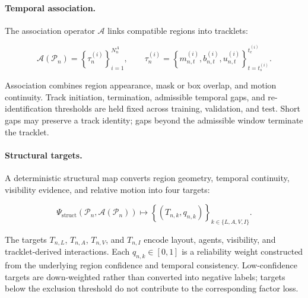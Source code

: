 \paragraph{Temporal association.}
The association operator \(\mathcal A\) links compatible regions into
tracklets:

\begin{equation*}
\mathcal A(\mathcal P_n)
=
\left\{
\tau_n^{(i)}
\right\}_{i=1}^{N_n^A},
\qquad
\tau_n^{(i)}
=
\left\{
m_{n,t}^{(i)},
b_{n,t}^{(i)},
u_{n,t}^{(i)}
\right\}_{t=t_s^{(i)}}^{t_e^{(i)}} .
\end{equation*}

Association combines region appearance, mask or box overlap, and
motion continuity. Track initiation, termination, admissible temporal
gaps, and re-identification thresholds are held fixed across training,
validation, and test. Short gaps may preserve a track identity; gaps
beyond the admissible window terminate the tracklet.

\paragraph{Structural targets.}
A deterministic structural map converts region geometry, temporal
continuity, visibility evidence, and relative motion into four targets:

\[
\Psi_{\mathrm{struct}}
\left(
\mathcal P_n,\mathcal A(\mathcal P_n)
\right)
\longmapsto
\left\{
\left(T_{n,k},q_{n,k}\right)
\right\}_{k\in\{L,A,V,I\}} .
\]

The targets \(T_{n,L}\), \(T_{n,A}\), \(T_{n,V}\), and \(T_{n,I}\)
encode layout, agents, visibility, and tracklet-derived interactions.
Each \(q_{n,k}\in[0,1]\) is a reliability weight constructed from the
underlying region confidence and temporal consistency. Low-confidence
targets are down-weighted rather than converted into negative labels;
targets below the exclusion threshold do not contribute to the
corresponding factor loss.

